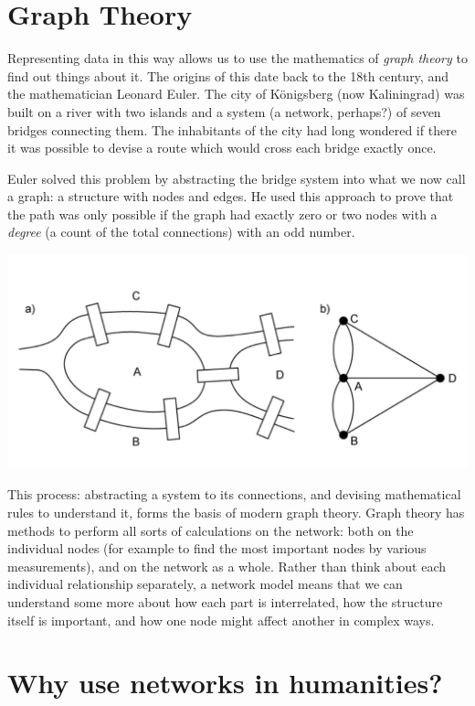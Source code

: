 \documentclass[
]{book}
\begin{document}
\hypertarget{graph-theory}{%
\section{Graph Theory}\label{graph-theory}}

Representing data in this way allows us to use the mathematics of \emph{graph theory} to find out things about it. The origins of this date back to the 18th century, and the mathematician Leonard Euler. The city of Königsberg (now Kaliningrad) was built on a river with two islands and a system (a network, perhaps?) of seven bridges connecting them. The inhabitants of the city had long wondered if there it was possible to devise a route which would cross each bridge exactly once.

Euler solved this problem by abstracting the bridge system into what we now call a graph: a structure with nodes and edges. He used this approach to prove that the path was only possible if the graph had exactly zero or two nodes with a \emph{degree} (a count of the total connections) with an odd number.

\includegraphics{images/Screenshot 2022-09-26 at 11.25.49.png}

This process: abstracting a system to its connections, and devising mathematical rules to understand it, forms the basis of modern graph theory. Graph theory has methods to perform all sorts of calculations on the network: both on the individual nodes (for example to find the most important nodes by various measurements), and on the network as a whole. Rather than think about each individual relationship separately, a network model means that we can understand some more about how each part is interrelated, how the structure itself is important, and how one node might affect another in complex ways.

\hypertarget{why-use-networks-in-humanities}{%
\section{Why use networks in humanities?}\label{why-use-networks-in-humanities}}
\end{document}
